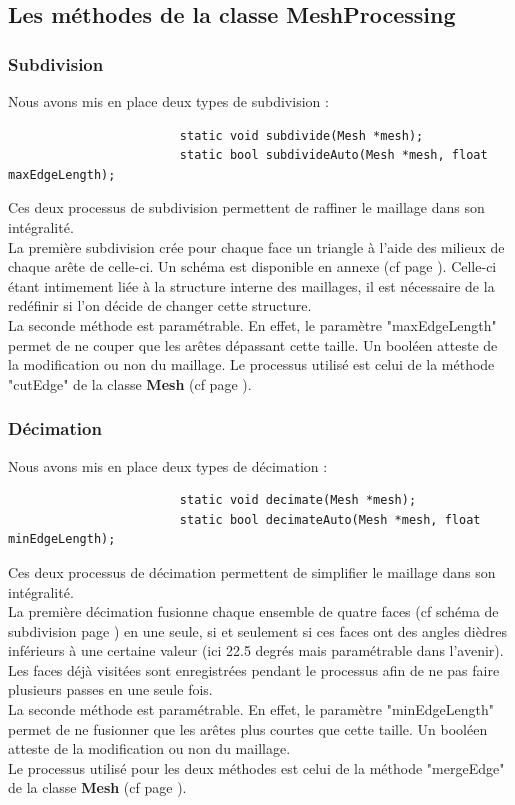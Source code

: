\documentclass[a4paper]{memoir}
\begin{document}
			\subsection{Les méthodes de la classe MeshProcessing}
				\label{processing-dev}
				\subsubsection{Subdivision}
					Nous avons mis en place deux types de subdivision :
					\begin{verbatim}
						static void subdivide(Mesh *mesh);
						static bool subdivideAuto(Mesh *mesh, float maxEdgeLength);
					\end{verbatim}
					Ces deux processus de subdivision permettent de raffiner le maillage dans son intégralité.\\
					La première subdivision crée pour chaque face un triangle à l'aide des milieux de chaque arête de celle-ci. Un schéma est disponible en 
					annexe (cf page \pageref{fig:subdivide}). Celle-ci étant intimement liée à la structure interne des maillages, il est nécessaire de la 
					redéfinir si l'on décide de changer cette structure.\\
					La seconde méthode est paramétrable. En effet, le paramètre "maxEdgeLength" permet de ne couper que les arêtes dépassant cette taille. 
					Un booléen atteste de la modification ou non du maillage. Le processus utilisé est celui de la méthode "cutEdge" de la classe 
					\textbf{Mesh} (cf page \pageref{mesh-dev}).
					
				\subsubsection{Décimation}
					Nous avons mis en place deux types de décimation :
					\begin{verbatim}
						static void decimate(Mesh *mesh);
						static bool decimateAuto(Mesh *mesh, float minEdgeLength);
					\end{verbatim}
					Ces deux processus de décimation permettent de simplifier le maillage dans son intégralité.\\
					La première décimation fusionne chaque ensemble de quatre faces (cf schéma de subdivision page \pageref{fig:subdivide}) en une seule, si 
					et seulement si ces faces ont des angles dièdres inférieurs à une certaine valeur (ici 22.5 degrés mais paramétrable dans l'avenir). Les 
					faces déjà visitées sont enregistrées pendant le processus afin de ne pas faire plusieurs passes en une seule fois.\\
					La seconde méthode est paramétrable. En effet, le paramètre "minEdgeLength" permet de ne fusionner que les arêtes plus courtes que cette 
					taille. Un booléen atteste de la modification ou non du maillage.\\
					Le processus utilisé pour les deux méthodes est celui de la méthode "mergeEdge" de la classe \textbf{Mesh} (cf page \pageref{mesh-dev}).
				
\end{document}
